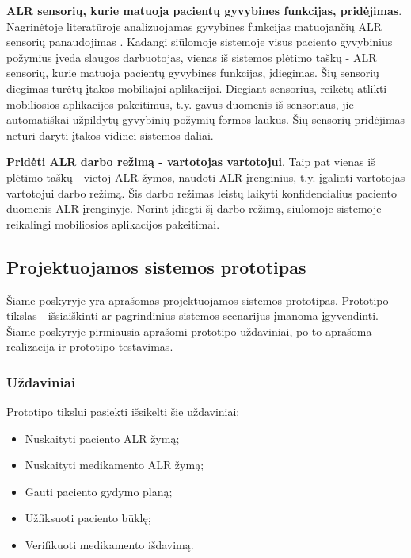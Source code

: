 \textbf{ALR sensorių, kurie matuoja pacientų gyvybines funkcijas, pridėjimas}. Nagrinėtoje literatūroje analizuojamas gyvybines funkcijas matuojančių ALR sensorių panaudojimas \cite{Strommer2006}. Kadangi siūlomoje sistemoje visus paciento gyvybinius požymius įveda slaugos darbuotojas, vienas iš sistemos plėtimo taškų - ALR sensorių, kurie matuoja pacientų gyvybines funkcijas, įdiegimas. Šių sensorių diegimas turėtų įtakos mobiliajai aplikacijai. Diegiant sensorius, reikėtų atlikti mobiliosios aplikacijos pakeitimus, t.y. gavus duomenis iš sensoriaus, jie automatiškai užpildytų gyvybinių požymių formos laukus. Šių sensorių pridėjimas neturi daryti įtakos vidinei sistemos daliai.

\textbf{Pridėti ALR darbo režimą - vartotojas vartotojui}. Taip pat vienas iš plėtimo taškų - vietoj ALR žymos, naudoti ALR įrenginius, t.y. įgalinti vartotojas vartotojui darbo režimą. Šis darbo režimas leistų laikyti konfidencialius paciento duomenis ALR įrenginyje. Norint įdiegti šį darbo režimą, siūlomoje sistemoje reikalingi mobiliosios aplikacijos pakeitimai.



\subsection{Projektuojamos sistemos prototipas}
Šiame poskyryje yra aprašomas projektuojamos sistemos prototipas. Prototipo tikslas - išsiaiškinti ar pagrindinius sistemos scenarijus įmanoma įgyvendinti. Šiame poskyryje pirmiausia aprašomi prototipo uždaviniai, po to aprašoma realizacija ir prototipo testavimas.

\subsubsection{Uždaviniai}
Prototipo tikslui pasiekti išsikelti šie uždaviniai:

\begin{itemize}
    \item Nuskaityti paciento ALR žymą;
    \item Nuskaityti medikamento ALR žymą;
    \item Gauti paciento gydymo planą;
    \item Užfiksuoti paciento būklę;
    \item Verifikuoti medikamento išdavimą.
\end{itemize}

